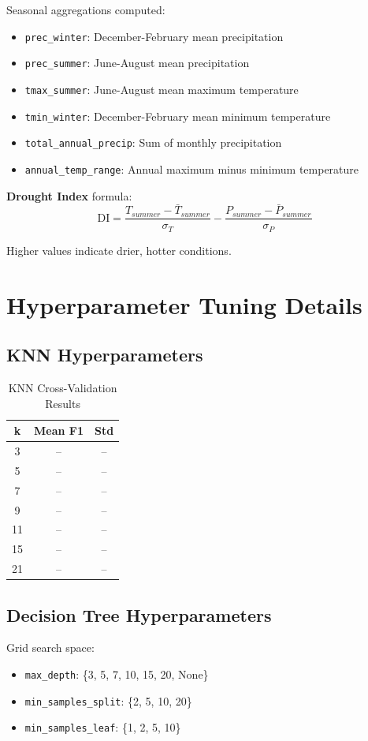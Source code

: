 Seasonal aggregations computed:
\begin{itemize}
    \item \texttt{prec\_winter}: December-February mean precipitation
    \item \texttt{prec\_summer}: June-August mean precipitation
    \item \texttt{tmax\_summer}: June-August mean maximum temperature
    \item \texttt{tmin\_winter}: December-February mean minimum temperature
    \item \texttt{total\_annual\_precip}: Sum of monthly precipitation
    \item \texttt{annual\_temp\_range}: Annual maximum minus minimum temperature
\end{itemize}

\textbf{Drought Index} formula:
\begin{equation}
    \text{DI} = \frac{T_{summer} - \bar{T}_{summer}}{\sigma_T} - \frac{P_{summer} - \bar{P}_{summer}}{\sigma_P}
\end{equation}

Higher values indicate drier, hotter conditions.

\chapter{Hyperparameter Tuning Details}
\label{app:hyperparams}

\section*{KNN Hyperparameters}
\begin{table}[H]
\centering
\caption{KNN Cross-Validation Results}
\begin{tabular}{|c|c|c|}
\hline
\textbf{k} & \textbf{Mean F1} & \textbf{Std} \\
\hline
3 & -- & -- \\
5 & -- & -- \\
7 & -- & -- \\
9 & -- & -- \\
11 & -- & -- \\
15 & -- & -- \\
21 & -- & -- \\
\hline
\end{tabular}
\end{table}

\section*{Decision Tree Hyperparameters}
Grid search space:
\begin{itemize}
    \item \texttt{max\_depth}: \{3, 5, 7, 10, 15, 20, None\}
    \item \texttt{min\_samples\_split}: \{2, 5, 10, 20\}
    \item \texttt{min\_samples\_leaf}: \{1, 2, 5, 10\}
\end{itemize}

